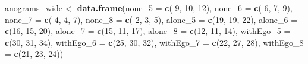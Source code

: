 \documentclass[]{article}
\newenvironment{Shaded}{\begin{snugshade}}{\end{snugshade}}
\newcommand{\KeywordTok}[1]{\textcolor[rgb]{0.13,0.29,0.53}{\textbf{#1}}}
\newcommand{\DataTypeTok}[1]{\textcolor[rgb]{0.13,0.29,0.53}{#1}}
\newcommand{\DecValTok}[1]{\textcolor[rgb]{0.00,0.00,0.81}{#1}}
\newcommand{\StringTok}[1]{\textcolor[rgb]{0.31,0.60,0.02}{#1}}
\newcommand{\NormalTok}[1]{#1}
\begin{document}
\begin{Shaded}
\begin{Highlighting}[]
\NormalTok{anograms_wide <-}\StringTok{ }\KeywordTok{data.frame}\NormalTok{(}\DataTypeTok{none_5    =} \KeywordTok{c}\NormalTok{( }\DecValTok{9}\NormalTok{, }\DecValTok{10}\NormalTok{, }\DecValTok{12}\NormalTok{),}
                            \DataTypeTok{none_6    =} \KeywordTok{c}\NormalTok{( }\DecValTok{6}\NormalTok{,  }\DecValTok{7}\NormalTok{,  }\DecValTok{9}\NormalTok{),}
                            \DataTypeTok{none_7    =} \KeywordTok{c}\NormalTok{( }\DecValTok{4}\NormalTok{,  }\DecValTok{4}\NormalTok{,  }\DecValTok{7}\NormalTok{),}
                            \DataTypeTok{none_8    =} \KeywordTok{c}\NormalTok{( }\DecValTok{2}\NormalTok{,  }\DecValTok{3}\NormalTok{,  }\DecValTok{5}\NormalTok{),}
                            \DataTypeTok{alone_5   =} \KeywordTok{c}\NormalTok{(}\DecValTok{19}\NormalTok{, }\DecValTok{19}\NormalTok{, }\DecValTok{22}\NormalTok{),}
                            \DataTypeTok{alone_6   =} \KeywordTok{c}\NormalTok{(}\DecValTok{16}\NormalTok{, }\DecValTok{15}\NormalTok{, }\DecValTok{20}\NormalTok{),}
                            \DataTypeTok{alone_7   =} \KeywordTok{c}\NormalTok{(}\DecValTok{15}\NormalTok{, }\DecValTok{11}\NormalTok{, }\DecValTok{17}\NormalTok{),}
                            \DataTypeTok{alone_8   =} \KeywordTok{c}\NormalTok{(}\DecValTok{12}\NormalTok{, }\DecValTok{11}\NormalTok{, }\DecValTok{14}\NormalTok{),}
                            \DataTypeTok{withEgo_5 =} \KeywordTok{c}\NormalTok{(}\DecValTok{30}\NormalTok{, }\DecValTok{31}\NormalTok{, }\DecValTok{34}\NormalTok{),}
                            \DataTypeTok{withEgo_6 =} \KeywordTok{c}\NormalTok{(}\DecValTok{25}\NormalTok{, }\DecValTok{30}\NormalTok{, }\DecValTok{32}\NormalTok{),}
                            \DataTypeTok{withEgo_7 =} \KeywordTok{c}\NormalTok{(}\DecValTok{22}\NormalTok{, }\DecValTok{27}\NormalTok{, }\DecValTok{28}\NormalTok{),}
                            \DataTypeTok{withEgo_8 =} \KeywordTok{c}\NormalTok{(}\DecValTok{21}\NormalTok{, }\DecValTok{23}\NormalTok{, }\DecValTok{24}\NormalTok{))}


\end{Highlighting}
\end{Shaded}
\end{document}
